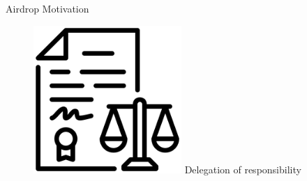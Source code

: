 \documentclass[handout]{beamer}
\begin{document}
\begin{frame}{Airdrop Motivation}
\begin{figure}[H]
\begin{minipage}[t]{.25\textwidth}
    \includegraphics[width=0.5\textwidth]{../assets/images/legislation.png}
    \vspace{0.8em}\vspace{2.7em}
    Delegation of responsibility
  \end{minipage}  
\end{figure}
\end{frame}


\end{document}
